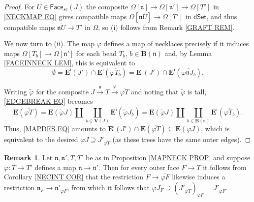 \documentclass[a4paper,10pt
,draft
]{article}%
\numberwithin{equation}{section}
\numberwithin{figure}{section}
\theoremstyle{definition} %
\newtheorem{remark}[equation]{Remark}%
\newcommand{\1}{\ensuremath{\mathbbm 1}}%
\begin{document}
\begin{proof}
	For $U \in \mathsf{Face}_{sc}(J)$
	the composite
	$\Omega[\mathfrak{n}] \to 
	\Omega[\mathfrak{n}'] \to 
	\Omega[T']$
	in \eqref{NECKMAP EQ}
	gives compatible maps
	$\Omega[\overline{\mathfrak{n} U}] \to \Omega[T']$
	in $\mathsf{dSet}$,
	and thus compatible maps
	$\overline{\mathfrak{n} U} \to T'$ 
	in $\Omega$,
	so (i) follows from 
	Remark \ref{GRAFT REM}.

	We now turn to (ii).
	The map $\varphi$ defines a map of necklaces 
	precisely if it induces maps
	$\Omega[T_b] \to \Omega[\mathfrak{n}']$
	for each bead 
	$T_b$, $b \in \boldsymbol{B}(\mathfrak n)$
	and, by Lemma \ref{FACEINNECK LEM},
	this is equivalent to
	\begin{equation}\label{MAPDES EQ}
	\emptyset
	=
	\boldsymbol{E}^{\mathsf{i}}(J')
	\cap
	\boldsymbol{E}^{\mathsf{i}}(\overline{ \varphi T_b})
	=
	\boldsymbol{E}^{\mathsf{i}}(J')
	\cap
	\boldsymbol{E}^{\mathsf{i}}(\overline{ \varphi \mathfrak{n} J_b}).
	\end{equation}
	
	Writing $\tilde{\varphi}$ for the composite
	$
	J \xrightarrow{\mathfrak n} T 
	\xrightarrow{\varphi} \overline{\varphi T}
	$
	and noting that $\tilde{\varphi}$ is tall,
	\eqref{EDGEBREAK EQ} becomes 
	\begin{equation}\label{DECOMPPR EQ}
	\boldsymbol{E}(\overline{\varphi T})
	=
	\boldsymbol{E}(\tilde{\varphi} J)
	\amalg
	\coprod_{b \in \boldsymbol{V}(J)}
	\boldsymbol{E}^{\mathsf{i}}(\overline{\tilde{\varphi} J_b})
	=
	\boldsymbol{E}(\tilde{\varphi} J)
	\amalg
	\coprod_{b \in \boldsymbol{B}(\mathfrak n)}
	\boldsymbol{E}^{\mathsf{i}}(\overline{\varphi T_b}).
	\end{equation}
	Thus, \eqref{MAPDES EQ}
	amounts to
	$\boldsymbol{E}^{\mathsf{i}}(J') \cap 
	\boldsymbol{E}(\overline{\varphi T})
	\subseteq
	\boldsymbol{E}(\varphi J)$,
	which is equivalent to the desired
	$\varphi J \supseteq J'_{\overline{\varphi T}}$
	(as these trees have the same outer edges).
\end{proof}



\begin{remark}\label{NECKMAPCHAR REM}
	Let $\mathfrak{n},\mathfrak{n}',T,T'$ be as in
	Proposition \ref{MAPNECK PROP}
	and suppose 
	$\varphi \colon T \to T'$
	defines a map
	$\mathfrak{n} \to \mathfrak{n}'$.
	Then for every outer face $F \to T$
	it follows from 
	Corollary \ref{NECINT COR}
	that the restriction 
	$F \to \overline{\varphi F}$
	likewise induces a restriction
	$\mathfrak{n}_F \to \mathfrak{n}'_{\overline{\varphi F}}$,
	from which it follows that
	$\varphi J_F \supseteq 
	\left(J'_{\overline{\varphi T}}\right)_{\overline{\varphi F}}
	=
	J'_{\overline{\varphi F}}$.
\end{remark}
\end{document}
